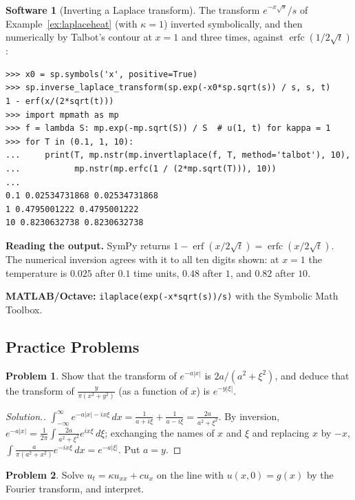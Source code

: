 \documentclass[11pt,a4paper]{article}
\numberwithin{equation}{section}
\theoremstyle{definition}
\newtheorem{software}[thm]{Software}
\newtheorem{problemx}{Problem}[subsection]
\newenvironment{problem}{\begin{problemx}}{\end{problemx}}
\newenvironment{solution}
  {\renewcommand{\qedsymbol}{}\begin{proof}[\textit{Solution}.]}
  {\end{proof}}
\begin{document}
\begin{software}[Inverting a Laplace transform]
\label{sw:laplace}
The transform $e^{-x\sqrt s}/s$ of Example~\ref{ex:laplaceheat} (with $\kappa = 1$) inverted symbolically, and then numerically by Talbot's contour at $x = 1$ and three times, against $\operatorname{erfc}(1/2\sqrt t)$:
{\small\begin{verbatim}
>>> x0 = sp.symbols('x', positive=True)
>>> sp.inverse_laplace_transform(sp.exp(-x0*sp.sqrt(s)) / s, s, t)
1 - erf(x/(2*sqrt(t)))
>>> import mpmath as mp
>>> f = lambda S: mp.exp(-mp.sqrt(S)) / S  # u(1, t) for kappa = 1
>>> for T in (0.1, 1, 10):
...     print(T, mp.nstr(mp.invertlaplace(f, T, method='talbot'), 10),
...           mp.nstr(mp.erfc(1 / (2*mp.sqrt(T))), 10))
...
0.1 0.02534731868 0.02534731868
1 0.4795001222 0.4795001222
10 0.8230632738 0.8230632738
\end{verbatim}}
\textbf{Reading the output.} SymPy returns $1 - \operatorname{erf}(x/2\sqrt t) = \operatorname{erfc}(x/2\sqrt t)$. The numerical inversion agrees with it to all ten digits shown: at $x = 1$ the temperature is $0.025$ after $0.1$ time units, $0.48$ after $1$, and $0.82$ after $10$.

\textbf{MATLAB/Octave:} \texttt{ilaplace(exp(-x*sqrt(s))/s)} with the Symbolic Math Toolbox.
\end{software}

\subsection{Practice Problems}

\begin{problem}
Show that the transform of $e^{-a|x|}$ is $2a/(a^2 + \xi^2)$, and deduce that the transform of $\frac{y}{\pi(x^2 + y^2)}$ (as a function of $x$) is $e^{-y|\xi|}$.
\end{problem}

\begin{solution}
$\int_{-\infty}^\infty e^{-a|x| - ix\xi}\,dx = \frac1{a + i\xi} + \frac1{a - i\xi} = \frac{2a}{a^2 + \xi^2}$. By inversion, $e^{-a|x|} = \frac1{2\pi}\int\frac{2a}{a^2 + \xi^2}e^{ix\xi}\,d\xi$; exchanging the names of $x$ and $\xi$ and replacing $x$ by $-x$, $\int\frac{a}{\pi(a^2 + x^2)}e^{-ix\xi}\,dx = e^{-a|\xi|}$. Put $a = y$.
\end{solution}

\begin{problem}
Solve $u_t = \kappa u_{xx} + cu_x$ on the line with $u(x, 0) = g(x)$ by the Fourier transform, and interpret.
\end{problem}
\end{document}
